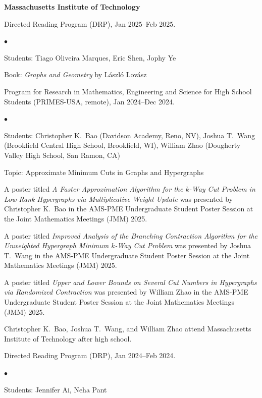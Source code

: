 \documentclass[margin,line]{res}
\newenvironment{list2}{
  \begin{list}{$\bullet$}{%
      \setlength{\itemsep}{0in}
      \setlength{\parsep}{0in} \setlength{\parskip}{0in}
      \setlength{\topsep}{0in} \setlength{\partopsep}{0in}
      \setlength{\leftmargin}{0.2in}}}{\end{list}}
\newenvironment{list3}{
  \begin{list}{\ding{113}}{%
      \setlength{\itemsep}{0.05in}
      \setlength{\parsep}{0.025in} \setlength{\parskip}{0in}
      \setlength{\topsep}{0in} \setlength{\partopsep}{0in}
      \setlength{\leftmargin}{0.17in}}}{\end{list}}
\begin{document}
\begin{resume}
{\bf Massachusetts Institute of Technology}\\
\vspace*{-.1in}
\begin{list3}
\item[] Directed Reading Program (DRP), Jan 2025--Feb 2025.
  \begin{list2}
    \item[$\circ$] Students: Tiago Oliveira Marques, Eric Shen, Jophy Ye
    \item[$\circ$] Book: \emph{Graphs and Geometry} by L\'aszl\'o Lov\'asz
  \end{list2}
\item[] Program for Research in Mathematics, Engineering and Science for High School Students (PRIMES-USA, remote), Jan 2024--Dec 2024.
  \begin{list2}
  \item[$\circ$] Students: Christopher K.\ Bao (Davidson Academy, Reno, NV), Joshua T.\ Wang (Brookfield Central High School, Brookfield, WI), William Zhao (Dougherty Valley High School, San Ramon, CA)
  \item[$\circ$] Topic: Approximate Minimum Cuts in Graphs and Hypergraphs
  \item[$\circ$] A poster titled \emph{A Faster Approximation Algorithm for the $k$-Way Cut Problem in Low-Rank Hypergraphs via Multiplicative Weight Update} was presented by Christopher K.\ Bao in the AMS-PME Undergraduate Student Poster Session at the Joint Mathematics Meetings (JMM) 2025.
  \item[$\circ$] A poster titled \emph{Improved Analysis of the Branching Contraction Algorithm for the Unweighted Hypergraph Minimum $k$-Way Cut Problem} was presented by Joshua T.\ Wang in the AMS-PME Undergraduate Student Poster Session at the Joint Mathematics Meetings (JMM) 2025.
  \item[$\circ$] A poster titled \emph{Upper and Lower Bounds on Several Cut Numbers in Hypergraphs via Randomized Contraction} was presented by William Zhao in the AMS-PME Undergraduate Student Poster Session at the Joint Mathematics Meetings (JMM) 2025.
  \item[$\circ$] Christopher K.\ Bao, Joshua T.\ Wang, and William Zhao attend Massachusetts Institute of Technology after high school.
  \end{list2}
\item[] Directed Reading Program (DRP), Jan 2024--Feb 2024.
  \begin{list2}
  \item[$\circ$] Students: Jennifer Ai, Neha Pant

\end{list2}
\end{list3}
\end{resume}
\end{document}
